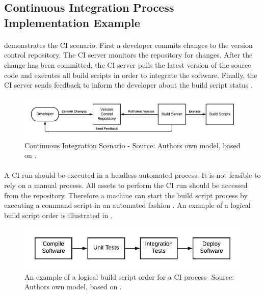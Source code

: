 \subsection{Continuous Integration Process Implementation Example}
\paragraph{} demonstrates the CI scenario.
First a developer commits changes to the version control repository.
The CI server monitors the repository for changes. After the change has been committed, the CI server pulls the latest version of the source code and executes all build scripts in order to integrate the software.
Finally, the CI server sends feedback to inform the developer about the build script status  \cite{Duvall2007CI}.


\begin{figure}[h]
\centering
\includegraphics[scale=0.7]{images/02_theoretical_foundation/deployment_pipeline/ci_scenario}
\caption{Continuous Integration Scenario - Source: Authors own model, based on \cite{Duvall2007CI}.}
\label{fig:02_foundation_deployment_ci_scenario}
\end{figure}


\paragraph{}A CI run should be executed in a headless automated process. It is not feasible to rely on a manual process.
All assets to perform the CI run should be accessed from the repository. Therefore a machine can start the build script process by executing a command script in an automated fashion \cite{Duvall2007CI}.
An example of a logical build script order is illustrated in .


\begin{figure}[h]
\centering
\includegraphics[scale=1]{images/02_theoretical_foundation/deployment_pipeline/ci_build_script_order}
\caption{An example of a logical build script order for a CI process- Source: Authors own model, based on \cite{Duvall2007CI}.}
\label{fig:02_foundation_deployment_ci_script-order}
\end{figure}


